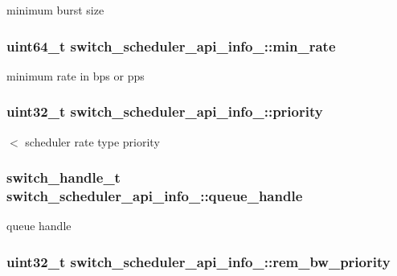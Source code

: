 minimum burst size \hypertarget{structswitch__scheduler__api__info___a8a1df3a5a53915ae7f5399badc2a4173}{
\subsubsection[{min\+\_\+rate}]{\setlength{\rightskip}{0pt plus 5cm}uint64\+\_\+t switch\+\_\+scheduler\+\_\+api\+\_\+info\+\_\+\+::min\+\_\+rate}}\label{structswitch__scheduler__api__info___a8a1df3a5a53915ae7f5399badc2a4173}
minimum rate in bps or pps \hypertarget{structswitch__scheduler__api__info___a00be453b7f125827b4cdd214758ed3b8}{
\subsubsection[{priority}]{\setlength{\rightskip}{0pt plus 5cm}uint32\+\_\+t switch\+\_\+scheduler\+\_\+api\+\_\+info\+\_\+\+::priority}}\label{structswitch__scheduler__api__info___a00be453b7f125827b4cdd214758ed3b8}
$<$ scheduler rate type priority \hypertarget{structswitch__scheduler__api__info___a39c03f1d9101f9f365624ed294ff6298}{
\subsubsection[{queue\+\_\+handle}]{\setlength{\rightskip}{0pt plus 5cm}switch\+\_\+handle\+\_\+t switch\+\_\+scheduler\+\_\+api\+\_\+info\+\_\+\+::queue\+\_\+handle}}\label{structswitch__scheduler__api__info___a39c03f1d9101f9f365624ed294ff6298}
queue handle \hypertarget{structswitch__scheduler__api__info___af67753b2b5a967a2622509d6173e8583}{
\subsubsection[{rem\+\_\+bw\+\_\+priority}]{\setlength{\rightskip}{0pt plus 5cm}uint32\+\_\+t switch\+\_\+scheduler\+\_\+api\+\_\+info\+\_\+\+::rem\+\_\+bw\+\_\+priority}}\label{structswitch__scheduler__api__info___af67753b2b5a967a2622509d6173e8583}
